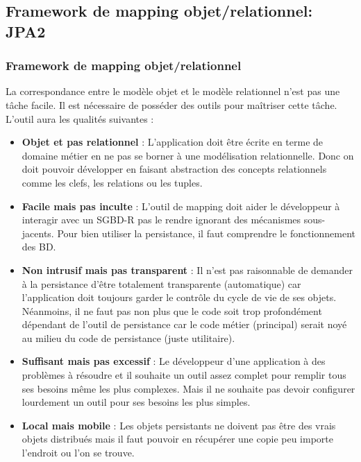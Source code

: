 \documentclass[xcolor=pdftex,x11names,table]{beamer}
\begin{document}
		\subsection{Framework de mapping objet/relationnel: JPA2}
		\begin{frame}[allowframebreaks]
    \frametitle{Framework de mapping objet/relationnel}
    La correspondance entre le modèle objet et le modèle relationnel n’est pas une tâche facile. Il est nécessaire de 
    posséder des outils pour maîtriser cette tâche. L'outil aura les qualités suivantes :
		  \begin{itemize}
		  	\item \textbf{Objet et pas relationnel} : L'application doit être écrite en terme de domaine métier en ne pas 
		  	se borner à une modélisation relationnelle. Donc on doit pouvoir développer en faisant abstraction des concepts 
		  	relationnels comme les clefs, les relations ou les tuples.
		  	\item \textbf{Facile mais pas inculte} : L'outil de mapping doit aider le développeur à interagir avec un SGBD-R 
		  	pas le rendre ignorant des mécanismes sous-jacents. Pour bien utiliser la persistance, il faut comprendre le 
		  	fonctionnement des BD.   
		  	\item \textbf{Non intrusif mais pas transparent} : Il n'est pas raisonnable de demander à la persistance d'être 
		  	totalement transparente (automatique) car l'application doit toujours garder le contrôle du cycle de vie de ses objets. 
		  	Néanmoins, il ne faut pas non plus que le code soit trop profondément dépendant de l'outil de persistance car le 
		  	code métier (principal) serait noyé au milieu du code de persistance (juste utilitaire).
		  	\item \textbf{Suffisant mais pas excessif} : Le développeur d'une application à des problèmes à résoudre et il 
		  	souhaite un outil assez complet pour remplir tous ses besoins même les plus complexes. Mais il ne souhaite pas 
		  	devoir configurer lourdement un outil pour ses besoins les plus simples.
		  	\item \textbf{Local mais mobile} : Les objets persistants ne doivent pas être des vrais objets distribués mais il 
		  	faut pouvoir en récupérer une copie peu importe l'endroit ou l'on se trouve.  
		  \end{itemize}	
   	\end{frame}
\end{document}
